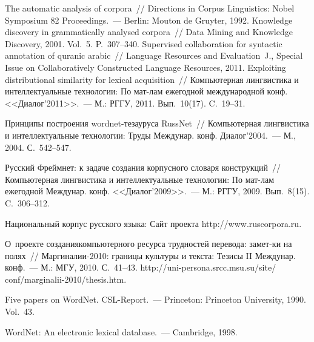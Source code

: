 \begin{multicols}{2}
{\small\frenchspacing
{%
\begin{thebibliography}{99}

 The automatic analysis of corpora~// Directions in Corpus Linguistics: Nobel 
Symposium 82 Proceedings.~--- Berlin: Mouton de Gruyter, 1992.
 Knowledge discovery in grammatically analysed corpora~// Data 
Mining and Knowledge Discovery, 2001. Vol.~5. P.~307--340. 
 Supervised collaboration for syntactic annotation of 
quranic arabic~// Language Resources and Evaluation~J., Special Issue on Collaboratively 
Constructed Language Resources, 2011.
 Exploiting distributional similarity for lexical acquisition~// Компьютерная 
лингвистика и интеллектуальные технологии: По мат-лам ежегодной международной 
конф. <<Диалог'2011>>.~--- М.: РГГУ, 2011. Вып.~10(17). C.~19--31.

 Принципы построения 
wordnet-те\-зау\-ру\-са RussNet~// Компьютерная лингвистика и интеллектуальные 
технологии: Труды Междунар. конф. Диалог'2004.~--- М., 2004. С.~542--547.

 Русский Фреймнет: к задаче создания корпусного 
словаря конструкций~// Компьютерная лингвистика и интеллектуальные технологии: По 
мат-лам ежегодной Междунар. конф. <<Диалог'2009>>.~---  М.: РГГУ, 2009. 
Вып.~8(15). C.~306--312.

Национальный корпус русского языка: Сайт проекта {\sf http://www.ruscorpora.ru}.


 О~проекте создания\linebreak компьютерного ресурса 
трудностей перевода: замет-\linebreak ки на полях~// Маргиналии-2010: границы культуры и текста: 
Тезисы II Междунар. конф.~--- М.: МГУ, 2010. 
С.~41--43. {\sf http://uni-persona.srcc.msu.su/site/ conf/marginalii-2010/thesis.htm}.


Five papers on WordNet. CSL-Report.~--- Princeton: Princeton University, 1990.  Vol.~43.

 WordNet: An electronic lexical database.~--- Cambridge, 1998. 




\end{thebibliography}}}
\end{multicols}
